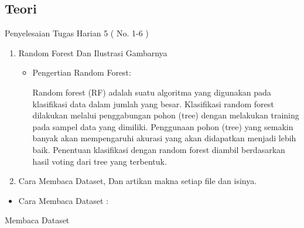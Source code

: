 \subsection{Teori}
Penyelesaian Tugas Harian 5 ( No. 1-6 )
\begin{enumerate}
\item Random Forest Dan Ilustrasi Gambarnya
\begin{itemize}
\item Pengertian Random Forest:
\par Random forest (RF) adalah suatu algoritma yang digunakan pada klasifikasi data dalam jumlah yang besar. Klasifikasi random forest dilakukan melalui penggabungan pohon (tree) dengan melakukan training pada sampel data yang dimiliki. Penggunaan pohon (tree) yang semakin banyak akan mempengaruhi akurasi yang akan didapatkan menjadi lebih baik. Penentuan klasifikasi dengan random forest diambil berdasarkan hasil voting dari tree yang terbentuk.
\end{itemize}
\item Cara Membaca Dataset, Dan artikan makna setiap file dan isinya.
\end{enumerate}
\begin{itemize}
\item Cara Membaca Dataset :
\end{itemize}
\par Membaca Dataset
